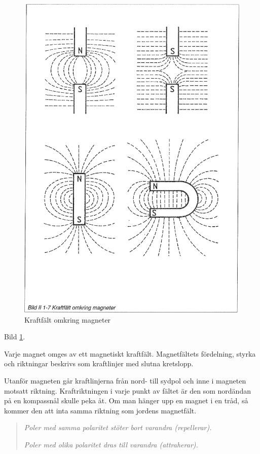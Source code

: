 \begin{figure}
  \includegraphics[width=\textwidth]{images/bild_2_1-07}
  \caption{Kraftfält omkring magneter}
  \label{fig:BildII1-7}
\end{figure}

Bild \ref{fig:BildII1-7}.

Varje magnet omges av ett magnetiskt kraftfält. Magnetfältets fördelning,
styrka och riktningar beskrivs som kraftlinjer med slutna kretslopp.

Utanför magneten går kraftlinjerna från nord- till sydpol och inne i magneten 
motsatt riktning. Kraftriktningen i varje punkt av fältet är den som nordändan
på en kompassnål skulle peka åt. Om man hänger upp en magnet i en tråd, så
kommer den att inta samma riktning som jordens magnetfält.

\begin{quote}
\emph{Poler med samma polaritet stöter bort varandra (repellerar).}

\emph{Poler med olika polaritet dras till varandra (attraherar).}
\end{quote}

